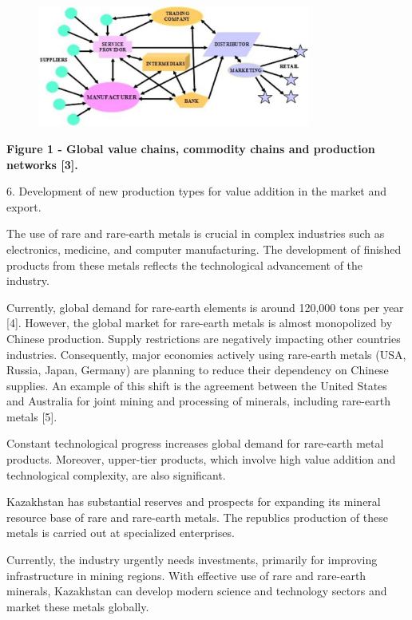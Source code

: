 \begin{figure}[H]
	\centering
	\includegraphics[width=0.8\textwidth]{assets/340}
	\caption*{}
\end{figure}

{\bfseries Figure 1 - Global value chains, commodity chains and production
networks {[}3{]}.}

6. Development of new production types for value addition in the market
and export.

The use of rare and rare-earth metals is crucial in complex industries
such as electronics, medicine, and computer manufacturing. The
development of finished products from these metals reflects the
technological advancement of the industry.

Currently, global demand for rare-earth elements is around 120,000 tons
per year {[}4{]}. However, the global market for rare-earth metals is
almost monopolized by Chinese production. Supply restrictions are
negatively impacting other countries\textquotesingle{} industries.
Consequently, major economies actively using rare-earth metals (USA,
Russia, Japan, Germany) are planning to reduce their dependency on
Chinese supplies. An example of this shift is the agreement between the
United States and Australia for joint mining and processing of minerals,
including rare-earth metals {[}5{]}.

Constant technological progress increases global demand for rare-earth
metal products. Moreover, upper-tier products, which involve high value
addition and technological complexity, are also significant.

Kazakhstan has substantial reserves and prospects for expanding its
mineral resource base of rare and rare-earth metals. The
republic\textquotesingle s production of these metals is carried out at
specialized enterprises.

Currently, the industry urgently needs investments, primarily for
improving infrastructure in mining regions. With effective use of rare
and rare-earth minerals, Kazakhstan can develop modern science and
technology sectors and market these metals globally.

